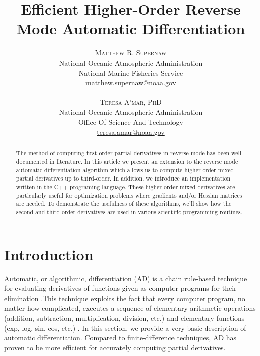 \documentclass[oneside]{article}
\title{\vspace{-15mm}\fontsize{24pt}{10pt}\selectfont\textbf{Efficient Higher-Order Reverse Mode Automatic Differentiation}} %
\author{
\large
\textsc{Matthew R. Supernaw}\\[2mm] %
\normalsize National Oceanic Atmospheric Administration \\ %
\normalsize National Marine Fisheries Service\\ %
\normalsize \href{mailto:matthew.supernaw@noaa.gov}{matthew.supernaw@noaa.gov} \\ %
\\
\textsc{Teresa A'mar, PhD}\\[2mm] %
\normalsize National Oceanic Atmospheric Administration \\ %
\normalsize Office Of Science And Technology\\ %
\normalsize \href{mailto:teresa.amar@noaa.gov}{teresa.amar@noaa.gov} \\%
\vspace{-5mm}
}
\date{}
\begin{document}
\maketitle %

\thispagestyle{fancy} %


\begin{abstract}

\noindent
The method of computing first-order partial derivatives in reverse mode has been well documented in literature. In this article we present an extension to the reverse mode automatic differentiation algorithm which allows us to compute higher-order mixed partial derivatives up to third-order. In addition, we introduce an implementation written in the C++ programing language. These higher-order mixed derivatives are particularly useful for optimization problems where gradients and/or Hessian matrices are needed. To demonstrate the usefulness of these algorithms, we'll show how the second and third-order derivatives are used in various scientific programming routines. 


\end{abstract}



\section{Introduction}


\lettrine[nindent=0em,lines=3]{A}utomatic, or algorithmic, differentiation (AD) is a chain rule-based technique for evaluating derivatives
of functions given as computer programs for their elimination \cite{griewank}.This technique exploits the fact that every computer program, no matter how complicated, executes a sequence of elementary arithmetic operations (addition, subtraction, multiplication, division, etc.) and elementary functions (exp, log, sin, cos, etc.) \cite{wiki_ad}. In this section, we provide a very basic description of automatic differentiation. Compared to finite-difference techniques, AD has proven to be more efficient for accurately computing partial derivatives. \\
\end{document}
